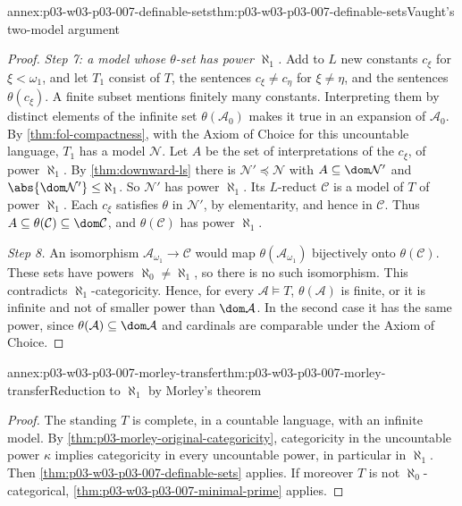 \begin{annexitem}{annex:p03-w03-p03-007-definable-sets}{thm:p03-w03-p03-007-definable-sets}{Vaught's two-model argument}
\begin{proof}
\emph{Step 7: a model whose \(\theta\)-set has power \(\aleph_1\).} Add to
\(L\) new constants \(c_\xi\) for \(\xi<\omega_1\), and let \(T_1\) consist of
\(T\), the sentences \(c_\xi\neq c_\eta\) for \(\xi\neq\eta\), and the
sentences \(\theta(c_\xi)\). A finite subset mentions finitely many
constants. Interpreting them by distinct elements of the infinite set
\(\theta(\mathcal A_0)\) makes it true in an expansion of \(\mathcal A_0\). By
\cref{thm:fol-compactness}, with the Axiom of Choice for this uncountable
language, \(T_1\) has a model \(\mathcal N\). Let \(A\) be the set of
interpretations of the \(c_\xi\), of power \(\aleph_1\). By
\cref{thm:downward-ls} there is \(\mathcal N'\preccurlyeq\mathcal N\) with
\(A\subseteq\dom\mathcal N'\) and \(\abs{\dom\mathcal N'}\le\aleph_1\). So
\(\mathcal N'\) has power \(\aleph_1\). Its \(L\)-reduct \(\mathcal C\) is a
model of \(T\) of power \(\aleph_1\). Each \(c_\xi\) satisfies \(\theta\) in
\(\mathcal N'\), by elementarity, and hence in \(\mathcal C\). Thus
\(A\subseteq\theta(\mathcal C)\subseteq\dom\mathcal C\), and
\(\theta(\mathcal C)\) has power \(\aleph_1\).

\emph{Step 8.} An isomorphism
\(\mathcal A_{\omega_1}\to\mathcal C\) would map
\(\theta(\mathcal A_{\omega_1})\) bijectively onto \(\theta(\mathcal C)\).
These sets have powers \(\aleph_0\neq\aleph_1\), so there is no such
isomorphism. This contradicts \(\aleph_1\)-categoricity. Hence, for every
\(\mathcal A\models T\), \(\theta(\mathcal A)\) is finite, or it is infinite
and not of smaller power than \(\dom\mathcal A\). In the second case it has
the same power, since \(\theta(\mathcal A)\subseteq\dom\mathcal A\) and
cardinals are comparable under the Axiom of Choice.
\end{proof}
\end{annexitem}

\begin{annexitem}{annex:p03-w03-p03-007-morley-transfer}{thm:p03-w03-p03-007-morley-transfer}{Reduction to \(\aleph_1\) by Morley's theorem}
\begin{proof}
The standing \(T\) is complete, in a countable language, with an infinite
model. By \cref{thm:p03-morley-original-categoricity}, categoricity in the
uncountable power \(\kappa\) implies categoricity in every uncountable power,
in particular in \(\aleph_1\). Then
\cref{thm:p03-w03-p03-007-definable-sets} applies. If moreover \(T\) is not
\(\aleph_0\)-categorical, \cref{thm:p03-w03-p03-007-minimal-prime} applies.
\end{proof}
\end{annexitem}

